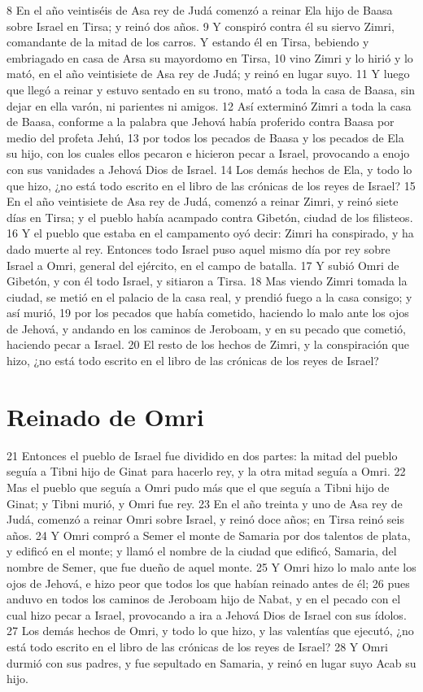 8 En el año veintiséis de Asa rey de Judá comenzó a reinar Ela hijo de Baasa sobre Israel en Tirsa; y reinó dos años.
9 Y conspiró contra él su siervo Zimri, comandante de la mitad de los carros. Y estando él en Tirsa, bebiendo y embriagado en casa de Arsa su mayordomo en Tirsa,
10 vino Zimri y lo hirió y lo mató, en el año veintisiete de Asa rey de Judá; y reinó en lugar suyo.
11 Y luego que llegó a reinar y estuvo sentado en su trono, mató a toda la casa de Baasa, sin dejar en ella varón, ni parientes ni amigos.
12 Así exterminó Zimri a toda la casa de Baasa, conforme a la palabra que Jehová había proferido contra Baasa por medio del profeta Jehú,
13 por todos los pecados de Baasa y los pecados de Ela su hijo, con los cuales ellos pecaron e hicieron pecar a Israel, provocando a enojo con sus vanidades a Jehová Dios de Israel.
14 Los demás hechos de Ela, y todo lo que hizo, ¿no está todo escrito en el libro de las crónicas de los reyes de Israel?
15 En el año veintisiete de Asa rey de Judá, comenzó a reinar Zimri, y reinó siete días en Tirsa; y el pueblo había acampado contra Gibetón, ciudad de los filisteos.
16 Y el pueblo que estaba en el campamento oyó decir: Zimri ha conspirado, y ha dado muerte al rey. Entonces todo Israel puso aquel mismo día por rey sobre Israel a Omri, general del ejército, en el campo de batalla.
17 Y subió Omri de Gibetón, y con él todo Israel, y sitiaron a Tirsa.
18 Mas viendo Zimri tomada la ciudad, se metió en el palacio de la casa real, y prendió fuego a la casa consigo; y así murió,
19 por los pecados que había cometido, haciendo lo malo ante los ojos de Jehová, y andando en los caminos de Jeroboam, y en su pecado que cometió, haciendo pecar a Israel.
20 El resto de los hechos de Zimri, y la conspiración que hizo, ¿no está todo escrito en el libro de las crónicas de los reyes de Israel?

\section*{Reinado de Omri}

21 Entonces el pueblo de Israel fue dividido en dos partes: la mitad del pueblo seguía a Tibni hijo de Ginat para hacerlo rey, y la otra mitad seguía a Omri.
22 Mas el pueblo que seguía a Omri pudo más que el que seguía a Tibni hijo de Ginat; y Tibni murió, y Omri fue rey.
23 En el año treinta y uno de Asa rey de Judá, comenzó a reinar Omri sobre Israel, y reinó doce años; en Tirsa reinó seis años.
24 Y Omri compró a Semer el monte de Samaria por dos talentos de plata,  y edificó en el monte; y llamó el nombre de la ciudad que edificó, Samaria, del nombre de Semer, que fue dueño de aquel monte.
25 Y Omri hizo lo malo ante los ojos de Jehová, e hizo peor que todos los que habían reinado antes de él;
26 pues anduvo en todos los caminos de Jeroboam hijo de Nabat, y en el pecado con el cual hizo pecar a Israel, provocando a ira a Jehová Dios de Israel con sus ídolos.
27 Los demás hechos de Omri, y todo lo que hizo, y las valentías que ejecutó, ¿no está todo escrito en el libro de las crónicas de los reyes de Israel?
28 Y Omri durmió con sus padres, y fue sepultado en Samaria, y reinó en lugar suyo Acab su hijo.

